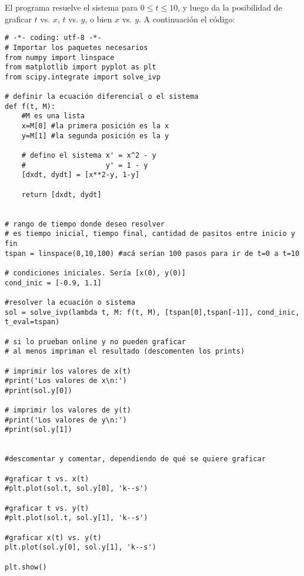 \documentclass[a4paper,11pt,landscape,twocolumn]{article}
\begin{document}
El programa resuelve el sistema para $0\leq t\leq 10$, y luego da la posibilidad de graficar $t$ vs. $x$, $t$ vs. $y$, o bien $x$ vs. $y$. A continuación el código:
\footnotesize{
\begin{verbatim}
# -*- coding: utf-8 -*-
# Importar los paquetes necesarios
from numpy import linspace
from matplotlib import pyplot as plt
from scipy.integrate import solve_ivp

# definir la ecuación diferencial o el sistema
def f(t, M):
    #M es una lista
    x=M[0] #la primera posición es la x
    y=M[1] #la segunda posición es la y

    # defino el sistema x' = x^2 - y
    #                   y' = 1 - y
    [dxdt, dydt] = [x**2-y, 1-y]

    return [dxdt, dydt]


# rango de tiempo donde deseo resolver
# es tiempo inicial, tiempo final, cantidad de pasitos entre inicio y fin
tspan = linspace(0,10,100) #acá serían 100 pasos para ir de t=0 a t=10

# condiciones iniciales. Sería [x(0), y(0)]
cond_inic = [-0.9, 1.1]

#resolver la ecuación o sistema
sol = solve_ivp(lambda t, M: f(t, M), [tspan[0],tspan[-1]], cond_inic, t_eval=tspan)

# si lo prueban online y no pueden graficar
# al menos impriman el resultado (descomenten los prints)

# imprimir los valores de x(t)
#print('Los valores de x\n:')
#print(sol.y[0])

# imprimir los valores de y(t)
#print('Los valores de y\n:')
#print(sol.y[1])


#descomentar y comentar, dependiendo de qué se quiere graficar

#graficar t vs. x(t)
#plt.plot(sol.t, sol.y[0], 'k--s')

#graficar t vs. y(t)
#plt.plot(sol.t, sol.y[1], 'k--s')

#graficar x(t) vs. y(t)
plt.plot(sol.y[0], sol.y[1], 'k--s')

plt.show()
\end{verbatim}
}
\end{document}
